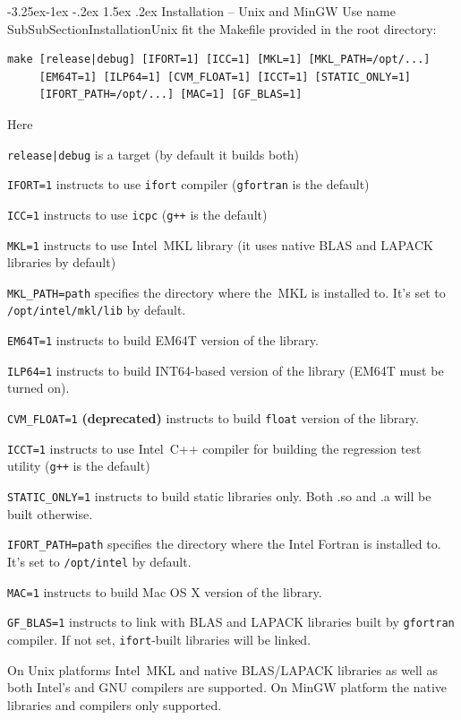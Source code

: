 \documentclass[12pt,letterpaper]{article}
\makeatletter
\renewcommand\subsubsection{\@startsection{subsubsection}{3}{0mm}%
                                     {-3.25ex\@plus -1ex \@minus -.2ex}%
                                     {1.5ex \@plus .2ex}%
                                     {\normalfont\normalsize\bfseries\sffamily}}
\makeatother
\begin{document}



\subsubsection{Installation -- Unix and MinGW}
Use%
\pdfdest name {SubSubSectionInstallationUnix} fit{}
the Makefile provided in the root directory:
\begin{Verbatim}
make [release|debug] [IFORT=1] [ICC=1] [MKL=1] [MKL_PATH=/opt/...] 
     [EM64T=1] [ILP64=1] [CVM_FLOAT=1] [ICCT=1] [STATIC_ONLY=1]
     [IFORT_PATH=/opt/...] [MAC=1] [GF_BLAS=1]
\end{Verbatim}
Here
\begin{compactitem}
\item \verb'release|debug' is a target (by default it builds both)
\item \verb'IFORT=1' instructs to use \verb"ifort"
compiler (\verb'gfortran' is the default)
\item \verb'ICC=1' instructs to use \verb"icpc"
(\verb'g++' is the default)
\item \verb'MKL=1' instructs to use Intel~MKL library (it uses
  native BLAS and LAPACK libraries by default)
\item \verb'MKL_PATH=path' specifies the directory where the~MKL is installed to.
It's set to \verb'/opt/intel/mkl/lib' by default.
\item \verb'EM64T=1' instructs to build EM64T version of the library.
\item \verb'ILP64=1' instructs to build INT64-based version of the library (EM64T must be turned on).
\item \verb'CVM_FLOAT=1' \textbf{(deprecated)} instructs to build \verb'float' version of the library.
\item \verb'ICCT=1' instructs to use Intel~C++ compiler for building the
regression test utility (\verb'g++' is the default)
\item \verb'STATIC_ONLY=1' instructs to build static libraries only.
Both .so and .a will be built otherwise.
\item \verb'IFORT_PATH=path' specifies the directory where the Intel Fortran is installed to. 
It's set to \verb"/opt/intel" by default.
\item \verb'MAC=1' instructs to build Mac OS X version of the library.
\item \verb'GF_BLAS=1' instructs to link with BLAS and LAPACK libraries built by 
\verb'gfortran' compiler. If not set, \verb'ifort'-built libraries will be linked.
\end{compactitem}
On Unix platforms Intel~MKL and native BLAS/LAPACK libraries as well
as both Intel's and GNU compilers are supported. On MinGW platform the native libraries and
compilers only supported.
\end{document}

